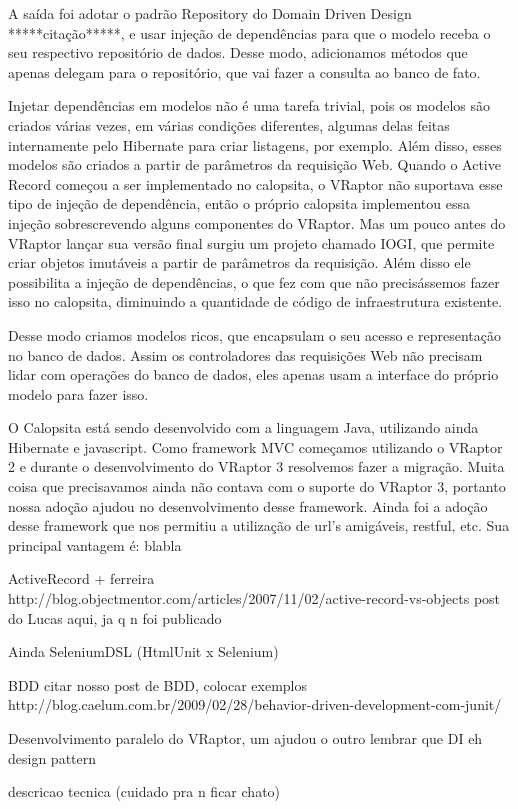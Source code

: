 A saída foi adotar o padrão Repository do Domain Driven Design *****citação*****, e usar injeção de dependências para
que o modelo receba o seu respectivo repositório de dados. Desse modo, adicionamos métodos que apenas delegam para o
repositório, que vai fazer a consulta ao banco de fato.

Injetar dependências em modelos não é uma tarefa trivial, pois os modelos são criados várias vezes, em várias condições
diferentes, algumas delas feitas internamente pelo Hibernate para criar listagens, por exemplo. Além disso, esses
modelos são criados a partir de parâmetros da requisição Web. Quando o Active Record começou a ser implementado no 
calopsita, o VRaptor não suportava esse tipo de injeção de dependência, então o próprio calopsita implementou essa
injeção sobrescrevendo alguns componentes do VRaptor. Mas um pouco antes do VRaptor lançar sua versão final surgiu
um projeto \opensource chamado IOGI, que permite criar objetos imutáveis a partir de parâmetros da requisição.
Além disso ele possibilita a injeção de dependências, o que fez com que não precisássemos fazer isso no calopsita,
diminuindo a quantidade de código de infraestrutura existente.

Desse modo criamos modelos ricos, que encapsulam o seu acesso e representação no banco de dados. Assim os controladores
das requisições Web não precisam lidar com operações do banco de dados, eles apenas usam a interface do próprio modelo
para fazer isso.



O Calopsita está sendo desenvolvido com a linguagem Java, utilizando ainda Hibernate e javascript. Como framework MVC começamos utilizando o VRaptor 2 e durante o desenvolvimento do VRaptor 3 resolvemos fazer a migração. Muita coisa que precisavamos ainda não contava com o suporte do VRaptor 3, portanto nossa adoção ajudou no desenvolvimento desse framework. Ainda foi a adoção desse framework que nos permitiu a utilização de url's amigáveis, restful, etc. Sua principal vantagem é: blabla




ActiveRecord + ferreira
http://blog.objectmentor.com/articles/2007/11/02/active-record-vs-objects
post do Lucas aqui, ja q n foi publicado

Ainda SeleniumDSL (HtmlUnit x Selenium)

BDD
citar nosso post de BDD, colocar exemplos
http://blog.caelum.com.br/2009/02/28/behavior-driven-development-com-junit/

Desenvolvimento paralelo do VRaptor, um ajudou o outro
lembrar que DI eh design pattern

descricao tecnica (cuidado pra n ficar chato)


